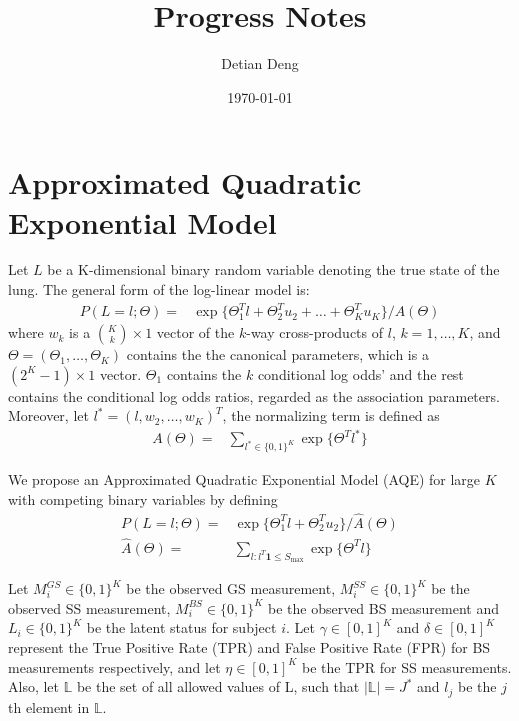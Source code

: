 \documentclass[11 pt, a4paper]{article}  %
\begin{document}
\title{Progress Notes}   %
\author{Detian Deng}         %
\date{\today}    %


\newpage
\section{Approximated Quadratic Exponential Model}
Let $L$ be a K-dimensional binary random variable denoting the true state of the lung. The general form of the log-linear model is:
\begin{align*}
P(L=l; \Theta) = & \exp \{\Theta_1^T l + \Theta_2^{T} u_2 + \ldots + \Theta_K^T u_K\}/ A(\Theta) 
\end{align*}
where $w_k$ is a ${K \choose k} \times 1$ vector of the $k$-way cross-products of $l$, $k = 1,\ldots,K$,  and $\Theta = (\Theta_1,\ldots, \Theta_K)$ contains the the canonical parameters, which is a $(2^K-1) \times 1$ vector. $\Theta_1$ contains the $k$ conditional log odds' and the rest contains the conditional log odds ratios, regarded as the association parameters. Moreover, let $l^* = (l,w_2,\dots,w_K)^T$, the normalizing term is defined as
\begin{align*}
A(\Theta) = & \sum_{l^*\in \{0,1\}^K}\exp \{ \Theta^T l^*\} 
\end{align*}

We propose an Approximated Quadratic Exponential Model (AQE) for large $K$ with competing binary variables by defining
\begin{align}
P(L=l; \Theta) = & \exp \{\Theta_1^T l + \Theta_2^{T} u_2 \}/ \hat{A}(\Theta) \\
\hat{A}(\Theta) = & \sum_{l:l^T\mathbf{1} \le S_{\max}}\exp \{ \Theta^T l\} 
\end{align}






\newpage
Let $M_i^{GS} \in \{0,1\}^K$ be the observed GS measurement, $M_i^{SS} \in \{0,1\}^K$ be the observed SS measurement, $M_i^{BS} \in \{0,1\}^K$ be the observed BS measurement and $L_i \in \{0,1\}^K$ be the latent status for subject $i$. Let $\gamma \in [0,1]^K$ and $\delta \in [0,1]^K$ represent the True Positive Rate (TPR) and False Positive Rate (FPR) for BS measurements respectively, and let $\eta \in [0,1]^K$ be the TPR for SS measurements. Also, let $\mathbb{L}$ be the set of all allowed values of L, such that $|\mathbb{L}| = J^*$ and $l_j$ be the $j$th element in $\mathbb{L}$.
\end{document}
